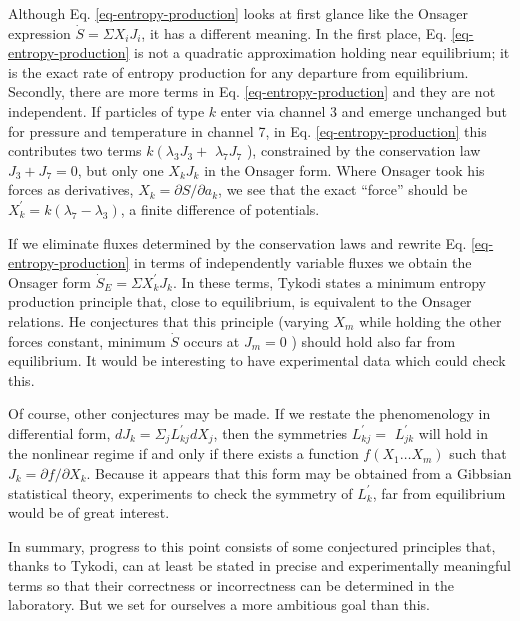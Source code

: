 \documentclass{article}
\begin{document}
Although Eq. \ref{eq-entropy-production} looks at first glance like the Onsager expression $\dot{S}=\Sigma X_i J_i$, it has a different meaning. In the first place, Eq. \ref{eq-entropy-production} is not a quadratic approximation holding near equilibrium; it is the exact rate of entropy production for any departure from equilibrium. Secondly, there are more terms in Eq. \ref{eq-entropy-production} and they are not independent. If particles of type $k$ enter via channel 3 and emerge unchanged but for pressure and temperature in channel 7, in Eq. \ref{eq-entropy-production} this contributes two terms $k\left(\lambda_3 J_3+\right.$ $\lambda_7 J_7$ ), constrained by the conservation law $J_3+J_7=0$, but only one $X_k J_k$ in the Onsager form. Where Onsager took his forces as derivatives, $X_k=\partial S / \partial a_k$, we see that the exact ``force'' should be $X_k^{\prime}=k\left(\lambda_7-\lambda_3\right)$, a finite difference of potentials.

If we eliminate fluxes determined by the conservation laws and rewrite Eq. \ref{eq-entropy-production} in terms of independently variable fluxes we obtain the Onsager form $\dot{S}_E=\Sigma X_k^{\prime} J_k$. In these terms, Tykodi states a minimum entropy production principle that, close to equilibrium, is equivalent to the Onsager relations. He conjectures that this principle (varying $X_m$ while holding the other forces constant, minimum $\dot{S}$ occurs at $J_m=0$ ) should hold also far from equilibrium. It would be interesting to have experimental data which could check this.

Of course, other conjectures may be made. If we restate the phenomenology in differential form, $d J_k=\Sigma_j L_{k j}^{\prime} d X_j$, then the symmetries $L_{k j}^{\prime}=$ $L_{j k}^{\prime}$ will hold in the nonlinear regime if and only if there exists a function $f\left(X_1 \ldots X_m\right)$ such that $J_k=\partial f / \partial X_k$. Because it appears that this form may be obtained from a Gibbsian statistical theory, experiments to check the symmetry of $L_k^{\prime}$, far from equilibrium would be of great interest.

In summary, progress to this point consists of some conjectured principles that, thanks to Tykodi, can at least be stated in precise and experimentally meaningful terms so that their correctness or incorrectness can be determined in the laboratory. But we set for ourselves a more ambitious goal than this.
\end{document}

